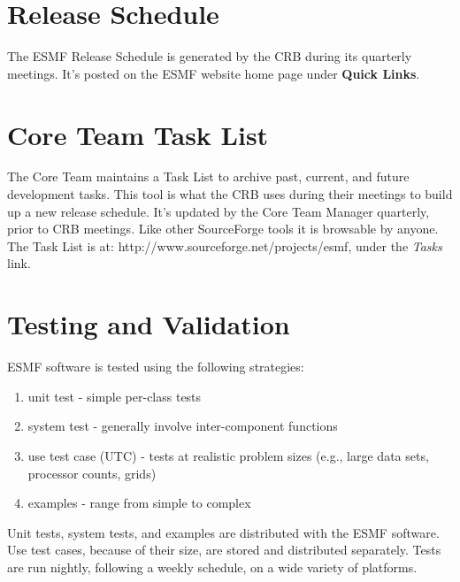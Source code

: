 
\section{Release Schedule}
\label{sec:build}

The ESMF Release Schedule is generated by the CRB during its
quarterly meetings.  It's posted on the ESMF website home
page under {\bf Quick Links}.

\section{Core Team Task List}

The Core Team maintains a Task List to archive past, current,
and future development tasks.  This tool is
what the CRB uses during their meetings to build up a new
release schedule.  It's updated by the Core Team Manager 
quarterly, prior to CRB meetings.  Like other SourceForge
tools it is browsable by anyone.  The Task List is at:  
{http://www.sourceforge.net/projects/esmf}, under the 
{\it Tasks} link. 

\section{Testing and Validation}
\label{sec:testing}

ESMF software is tested using the following strategies:
\begin{enumerate}
\item unit test - simple per-class tests
\item system test - generally involve inter-component functions
\item use test case (UTC) - tests at realistic problem sizes (e.g., large data sets, processor counts, grids)
\item examples - range from simple to complex
\end{enumerate}
Unit tests, system tests, and examples are distributed with the
ESMF software.  Use test cases, because of their size, are 
stored and distributed separately.  Tests are run nightly,
following a weekly schedule, on a wide variety of platforms.  

